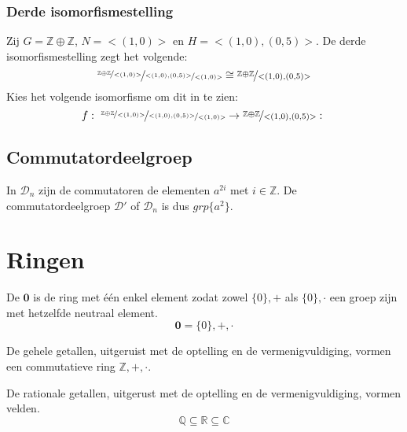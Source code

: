 \documentclass[main.tex]{subfiles}
\begin{document}
\subsubsection{Derde isomorfismestelling}
\label{sec:derde-isom}

\begin{vb}
  Zij $G = \mathbb{Z} \oplus \mathbb{Z}$, $N = <(1,0)>$ en $H=<(1,0),(0,5)>$.
  De derde isomorfismestelling zegt het volgende:
  \[
  \nicefrac{\nicefrac{\mathbb{Z} \oplus \mathbb{Z}}{<(1,0)>}}{\nicefrac{<(1,0),(0,5)>}{<(1,0)>}} \cong \nicefrac{\mathbb{Z} \oplus \mathbb{Z}}{<(1,0),(0,5)>}
  \]
  Kies het volgende isomorfisme om dit in te zien:
  \[ f:\ \nicefrac{\nicefrac{\mathbb{Z} \oplus \mathbb{Z}}{<(1,0)>}}{\nicefrac{<(1,0),(0,5)>}{<(1,0)>}} \rightarrow \nicefrac{\mathbb{Z} \oplus \mathbb{Z}}{<(1,0),(0,5)>}:\ \]
\end{vb}


\subsection{Commutatordeelgroep}

\begin{vb}
  In $\mathcal{D}_{n}$ zijn de commutatoren de elementen $a^{2i}$ met $i\in\mathbb{Z}$.
  De commutatordeelgroep $\mathcal{D}'$ of $\mathcal{D}_{n}$ is dus $grp\{a^{2}\}$.
\end{vb}



\section{Ringen}
\label{sec:ringen}

\begin{de}
  De  $\boldsymbol{0}$ is de ring met \'e\'en enkel element zodat zowel $\{0\},+$ als $\{0\},\cdot$ een groep zijn met hetzelfde neutraal element.
  \[ \boldsymbol{0} = \{0\},+,\cdot \]
  \commj
\end{de}

\begin{vb}
  De gehele getallen, uitgeruist met de optelling en de vermenigvuldiging, vormen een commutatieve ring $\mathbb{Z},+,\cdot$.
  \commj
\end{vb}

\begin{vb}
  De rationale getallen, uitgerust met de optelling en de vermenigvuldiging, vormen velden.
  \[ \mathbb{Q} \subseteq \mathbb{R} \subseteq \mathbb{C} \]
  \commj
\end{vb}
\end{document}
